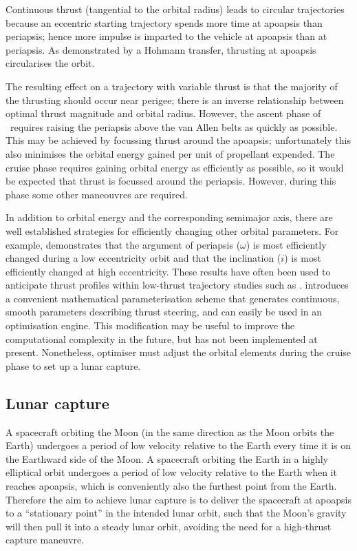 Continuous thrust (tangential to the orbital radius) leads to circular trajectories because an eccentric starting trajectory spends more time at apoapsis than periapsis; hence more impulse is imparted to the vehicle at apoapsis than at periapsis. As demonstrated by a Hohmann transfer, thrusting at apoapsis circularises the orbit.

The resulting effect on a trajectory with variable thrust is that the majority of the thrusting should occur near perigee; there is an inverse relationship between optimal thrust magnitude and orbital radius. However, the ascent phase of \BW\ requires raising the periapsis above the van Allen belts as quickly as possible. This may be achieved by focussing thrust around the apoapsis; unfortunately this also minimises the orbital energy gained per unit of propellant expended. The cruise phase requires gaining orbital energy as efficiently as possible, so it would be expected that thrust is focussed around the periapsis. However, during this phase some other maneouvres are required. 

In addition to orbital energy and the corresponding semimajor axis, there are well established strategies for efficiently changing other orbital parameters. For example, \textcite{Edelbaum1964} demonstrates that the argument of periapsis ($\omega$) is most efficiently changed during a low eccentricity orbit and that the inclination ($i$) is most efficiently changed at high eccentricity. These results have often been used to anticipate thrust profiles within low-thrust trajectory studies such as \textcite{Dachwald2007}. \textcite{Gao2008} introduces a convenient mathematical parameterisation scheme that generates continuous, smooth parameters describing thrust steering, and can easily be used in an optimisation engine. This modification may be useful to improve the computational complexity in the future, but has not been implemented at present. Nonetheless, optimiser must adjust the orbital elements during the cruise phase to set up a lunar capture.


\subsection{Lunar capture} \label{sub:Capture}

A spacecraft orbiting the Moon (in the same direction as the Moon orbits the Earth) undergoes a period of low velocity relative to the Earth every time it is on the Earthward side of the Moon. A spacecraft orbiting the Earth in a highly elliptical orbit undergoes a period of low velocity relative to the Earth when it reaches apoapsis, which is conveniently also the furthest point from the Earth. Therefore the aim to achieve lunar capture is to deliver the spacecraft at apoapsis to a \enquote{stationary point} in the intended lunar orbit, such that the Moon's gravity will then pull it into a steady lunar orbit, avoiding the need for a high-thrust capture maneuvre.

